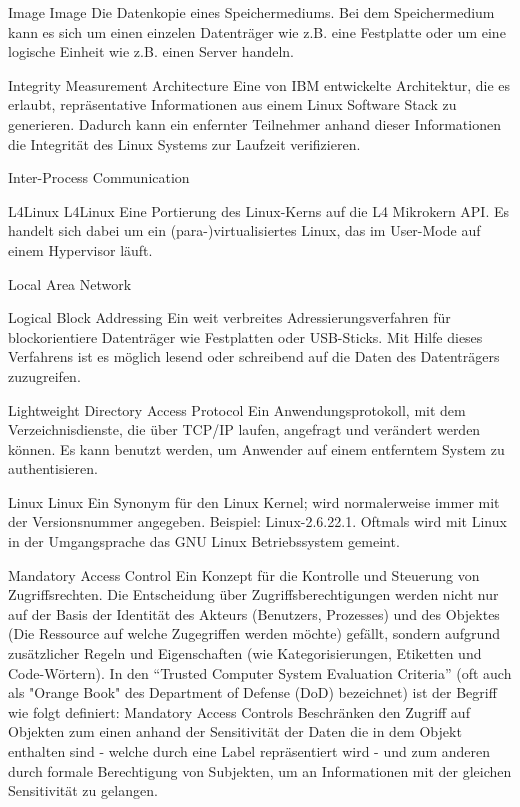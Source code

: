 \glosentry
	{Image}
	{Image}
	{Die Datenkopie eines Speichermediums. Bei dem Speichermedium
	kann es sich um einen einzelen Datentr\"ager wie z.B. eine Festplatte 
	oder um eine logische Einheit wie z.B. einen Server handeln.}

	{Integrity Measurement Architecture}
	{Eine von IBM entwickelte Architektur, die es erlaubt, repräsentative 
	 Informationen aus einem Linux Software Stack zu generieren.
	 Dadurch kann ein enfernter Teilnehmer anhand dieser Informationen
	 die Integrit\"at des Linux Systems zur Laufzeit verifizieren.}	 
	
	{Inter-Process Communication}

\glosentry
        {L4Linux}
        {L4Linux}
	{Eine Portierung des Linux-Kerns auf die L4 Mikrokern API. Es
	 handelt sich dabei um ein (para-)virtualisiertes Linux, das
	 im User-Mode auf einem Hypervisor l\"auft.}

	{Local Area Network}

	{Logical Block Addressing}
	{Ein weit verbreites Adressierungsverfahren f\"ur blockorientiere 
	Datentr\"ager wie Festplatten oder USB-Sticks. Mit Hilfe dieses 
	Verfahrens ist es m\"oglich lesend oder schreibend auf die Daten
	des Datentr\"agers zuzugreifen.}



        {Lightweight Directory Access Protocol}
        {Ein Anwendungsprotokoll, mit dem Verzeichnisdienste, die \"uber
	 TCP/IP laufen, angefragt und ver\"andert werden k\"onnen. Es kann
	 benutzt werden, um Anwender auf einem entferntem System zu
	 authentisieren.}	

\glosentry
	{Linux}
	{Linux}
	{Ein Synonym f\"ur den Linux Kernel; wird normalerweise immer mit
	der Versionsnummer angegeben. Beispiel: Linux-2.6.22.1.
	Oftmals wird mit Linux in der Umgangsprache das GNU Linux Betriebssystem
	gemeint.}

	{Mandatory Access Control}
	{Ein Konzept f\"ur die Kontrolle und Steuerung von Zugriffsrechten.
	 Die Entscheidung \"uber Zugriffsberechtigungen werden nicht nur auf der 
	 Basis der Identit\"at des Akteurs (Benutzers, Prozesses) und des 
	 Objektes (Die Ressource auf welche Zugegriffen werden m\"ochte) gef\"allt,
	 sondern aufgrund zus\"atzlicher Regeln und Eigenschaften 
	 (wie Kategorisierungen, Etiketten und Code-W\"ortern). 
	 In den ``Trusted Computer System Evaluation Criteria'' (oft auch als 
	 "Orange Book" des Department of Defense (DoD) bezeichnet) ist der 
	 Begriff wie folgt definiert:
	 Mandatory Access Controls Beschr\"anken den Zugriff auf Objekten 
	 zum einen anhand der Sensitivit\"at der Daten die in dem Objekt
	 enthalten sind - welche durch eine Label repr\"asentiert wird -
	 und zum anderen durch formale Berechtigung von Subjekten, um 
	 an Informationen mit der gleichen Sensitivit\"at zu gelangen.}	



